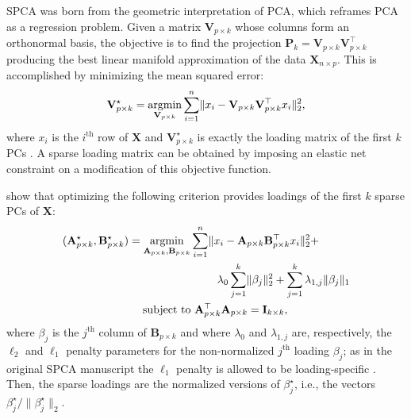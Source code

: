 SPCA was born from the geometric interpretation of PCA, which reframes PCA as a regression problem. Given a matrix $\mathbf{V}_{p \times k}$ whose columns form an orthonormal basis, the objective is to find the projection $\mathbf{P}_k = \mathbf{V}_{p \times k}\mathbf{V}_{p \times k}^\top$ producing the best linear manifold approximation of the data $\mathbf{X}_{n \times p}$. This is accomplished by minimizing the mean squared error:
\begin{equation}
\mathbf{V}_{p \times k}^{\star} = \operatorname*{argmin}_{\mathbf{V}_{p \times k}}\sum_{i=1}^n \lVert x_i-\mathbf{V}_{p \times k} \mathbf{V}_{p \times k}^\top x_i \rVert_2^2,
\end{equation}
where $x_i$ is the $i^{\text{th}}$ row of $\mathbf{X}$ and $\mathbf{V}_{p \times k}^{\star}$ is exactly the loading matrix of the first $k$ PCs \citep{ZouReview2018}. A sparse loading matrix can be obtained by imposing an elastic net constraint on a modification of this objective function.

\citet{Zou2006} show that optimizing the following criterion provides loadings of the first $k$ sparse PCs of $\mathbf{X}$:
\begin{equation}\label{eq:spca}
\begin{aligned}
  (\mathbf{A}^\star_{p \times k}, \mathbf{B}^\star_{p \times k}) & =
    \operatorname*{argmin}_{\mathbf{A}_{p \times k}, \mathbf{B}_{p \times k}}
    \sum_{i=1}^n \lVert x_i - \mathbf{A}_{p \times k}\mathbf{B}_{p \times k}^\top x_i \rVert_2^2 + \\
    & \quad \quad \quad \quad \quad \quad \quad \quad \lambda_0 \sum_{j=1}^k\lVert\beta_j\rVert^2_2 +
    \sum_{j=1}^k\lambda_{1,j} \lVert \beta_j \rVert_1 \\
  & \quad \; \text{subject to }\mathbf{A}_{p \times k}^\top\mathbf{A}_{p \times k} = \mathbf{I}_{k \times k},
\end{aligned}
\end{equation}
where $\beta_j$ is the $j^{\text{th}}$ column of $\mathbf{B}_{p \times k}$ and where $\lambda_0$ and $\lambda_{1,j}$ are, respectively, the $\ell_2$ and $\ell_1$ penalty parameters for the non-normalized $j^{\text{th}}$  loading $\beta_j$; as in the original SPCA manuscript the $\ell_1$ penalty is allowed to be loading-specific \citep{Zou2006}. Then, the sparse loadings are the normalized versions of $\beta_j^\star$, i.e., the vectors $\beta_j^\star/\lVert\beta_j^\star\rVert_2$.

